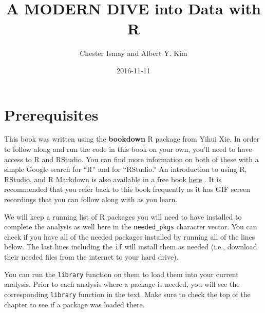 \documentclass[]{tufte-book}
\title{A MODERN DIVE into Data with R}
\author{Chester Ismay and Albert Y. Kim}
\date{2016-11-11}
\newenvironment{Shaded}{\begin{snugshade}}{\end{snugshade}}
\newcommand{\KeywordTok}[1]{\textcolor[rgb]{0.13,0.29,0.53}{\textbf{{#1}}}}
\newcommand{\DataTypeTok}[1]{\textcolor[rgb]{0.13,0.29,0.53}{{#1}}}
\newcommand{\StringTok}[1]{\textcolor[rgb]{0.31,0.60,0.02}{{#1}}}
\newcommand{\NormalTok}[1]{{#1}}
\begin{document}
\let\allcaps=\relax
\maketitle



{
\setcounter{tocdepth}{1}
\tableofcontents
}

\chapter{Prerequisites}\label{prereqs}

This book was written using the \textbf{bookdown} R package from Yihui
Xie. In order to follow along and run the code in this book on your own,
you'll need to have access to R and RStudio. You can find more
information on both of these with a simple Google search for ``R'' and
for ``RStudio.'' An introduction to using R, RStudio, and R Markdown is
also available in a free book
\href{http://ismayc.github.io/rbasics-book}{here} \citep{usedtor2016}.
It is recommended that you refer back to this book frequently as it has
GIF screen recordings that you can follow along with as you learn.

We will keep a running list of R packages you will need to have
installed to complete the analysis as well here in the
\texttt{needed\_pkgs} character vector. You can check if you have all of
the needed packages installed by running all of the lines below. The
last lines including the \texttt{if} will install them as needed (i.e.,
download their needed files from the internet to your hard drive).

You can run the \texttt{library} function on them to load them into your
current analysis. Prior to each analysis where a package is needed, you
will see the corresponding \texttt{library} function in the text. Make
sure to check the top of the chapter to see if a package was loaded
there.

\begin{Shaded}
\end{Shaded}
\end{document}
